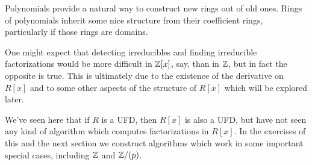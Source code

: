 Polynomials provide a natural way to construct new rings out of old ones. Rings of polynomials inherit some nice structure from their coefficient rings, particularly if those rings are domains.

\begin{center}
\end{center}

One might expect that detecting irreducibles and finding irreducible factorizations would be more difficult in \(\mathbb{Z}[x]\), say, than in \(\mathbb{Z}\), but in fact the opposite is true. This is ultimately due to the existence of the derivative on \(R[x]\) and to some other aspects of the structure of \(R[x]\) which will be explored later.

We've seen here that if \(R\) is a UFD, then \(R[x]\) is also a UFD, but have not seen any kind of algorithm which computes factorizations in \(R[x]\). In the exercises of this and the next section we construct algorithms which work in some important special cases, including \(\mathbb{Z}\) and \(\mathbb{Z}/(p)\).
